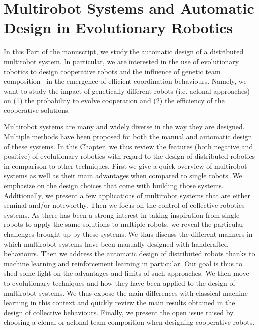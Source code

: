 \chapter{Multirobot Systems and Automatic Design in Evolutionary Robotics}
\label{chapter:design}


\minitoc[n] %

In this Part of the manuscript, we study the automatic design of a distributed multirobot system. In particular, we are interested in the use of evolutionary robotics to design cooperative robots and the influence of genetic team composition~\parencite{Waibel2009} in the emergence of efficient coordination behaviours. Namely, we want to study the impact of genetically different robots (i.e. aclonal approaches)~\parencite{Quinn2001} on (1) the probability to evolve cooperation and (2) the efficiency of the cooperative solutions.


Multirobot systems are many and widely diverse in the way they are designed. Multiple methods have been proposed for both the manual and automatic design of these systems. In this Chapter, we thus review the features (both negative and positive) of evolutionary robotics with regard to the design of distributed robotics in comparison to other techniques. First we give a quick overview of multirobot systems as well as their main advantages when compared to single robots. We emphasize on the design choices that come with building those systems. Additionally, we present a few applications of multirobot systems that are either seminal and/or noteworthy. Then we focus on the control of collective robotics systems. As there has been a strong interest in taking inspiration from single robots to apply the same solutions to multiple robots, we reveal the particular challenges brought up by these systems. We thus discuss the different manners in which multirobot systems have been manually designed with handcrafted behaviours. Then we address the automatic design of distributed robots thanks to machine learning and reinforcement learning in particular. Our goal is thus to shed some light on the advantages and limits of such approaches. We then move to evolutionary techniques and how they have been applied to the design of multirobot systems. We thus expose the main differences with classical machine learning in this context and quickly review the main results obtained in the design of collective behaviours. Finally, we present the open issue raised by choosing a clonal or aclonal team composition when designing cooperative robots.


